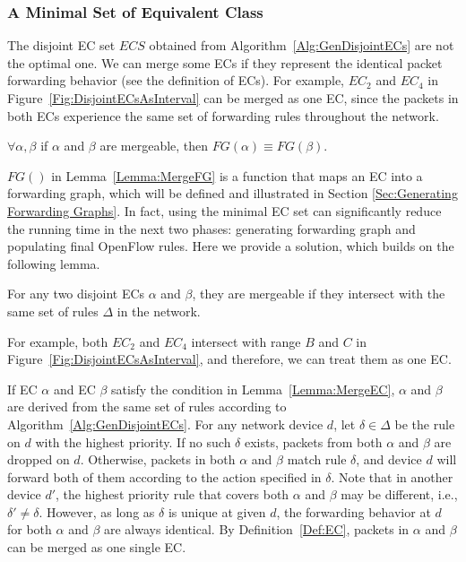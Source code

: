 \subsubsection{A Minimal Set of Equivalent Class}
The disjoint EC set $ECS$ obtained from Algorithm~\ref{Alg:GenDisjointECs} are not the optimal one. 
We can merge some ECs if they represent the identical packet forwarding behavior (see the definition of ECs). 
For example, $EC_2$ and $EC_4$ in Figure~\ref{Fig:DisjointECsAsInterval} can be merged as one EC, since the packets in both ECs experience the same set of forwarding rules throughout the network. %

\begin{lemma}
$\forall \alpha, \beta $ if $\alpha$ and $\beta$ are mergeable, then $FG(\alpha) \equiv FG(\beta)$.
\label{Lemma:MergeFG}
\end{lemma}
$FG()$ in Lemma~\ref{Lemma:MergeFG} is a function that maps an EC into a forwarding graph, which will be defined and illustrated in Section \ref{Sec:Generating Forwarding Graphs}. In fact, using the minimal EC set can significantly reduce the running time in the next two phases: generating forwarding graph and populating final OpenFlow rules. Here we provide a solution, which builds on the following lemma.

\begin{lemma}
For any two disjoint ECs $\alpha$ and $\beta$, they are mergeable
if they intersect with the same set of rules $\Delta$ in the network.
\label{Lemma:MergeEC}
\end{lemma}
For example, both $EC_2$ and $EC_4$ intersect with range $B$ and $C$ in Figure~\ref{Fig:DisjointECsAsInterval}, and therefore, we can treat them as one EC.

If EC $\alpha$ and EC $\beta$ satisfy the condition in Lemma~\ref{Lemma:MergeEC},
$\alpha$ and $\beta$ are derived from the same set of rules according to Algorithm~\ref{Alg:GenDisjointECs}.
For any network device $d$, let $\delta \in \Delta$ be the rule on $d$ with the highest priority.
If no such $\delta$ exists, packets from both $\alpha$ and $\beta$ are dropped on $d$.
Otherwise, packets in both $\alpha$ and $\beta$ match rule $\delta$, and
device $d$ will forward both of them according to the action specified in $\delta$.
Note that in another device $d'$, the highest priority rule that covers both $\alpha$
and $\beta$ may be different, i.e., $\delta' \neq \delta$.
However, as long as $\delta$ is unique at given $d$, the forwarding behavior at $d$ for both $\alpha$ and $\beta$ are always identical.
By Definition~\ref{Def:EC}, packets in $\alpha$ and $\beta$ can be merged as one single EC.

